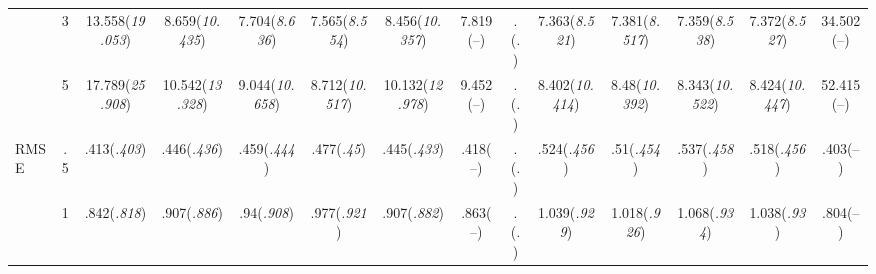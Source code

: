\documentclass{article}
\begin{document}
\begin{table}[tbp]
{\begin{tabularx}{\textwidth}{lCCCCCCCCCCCCC}
&3&13.558\newline (\emph{19.053})&8.659\newline (\emph{10.435})&7.704\newline (\emph{8.636})&7.565\newline (\emph{8.554})&8.456\newline (\emph{10.357})&7.819\newline (--)&.\newline (\emph{.})&7.363\newline (\emph{8.521})&7.381\newline (\emph{8.517})&7.359\newline (\emph{8.538})&7.372\newline (\emph{8.527})&34.502\newline (--) \tabularnewline
&5&17.789\newline (\emph{25.908})&10.542\newline (\emph{13.328})&9.044\newline (\emph{10.658})&8.712\newline (\emph{10.517})&10.132\newline (\emph{12.978})&9.452\newline (--)&.\newline (\emph{.})&8.402\newline (\emph{10.414})&8.48\newline (\emph{10.392})&8.343\newline (\emph{10.522})&8.424\newline (\emph{10.447})&52.415\newline (--) \tabularnewline
\midrule RMSE&.5&.413\newline (\emph{.403})&.446\newline (\emph{.436})&.459\newline (\emph{.444})&.477\newline (\emph{.45})&.445\newline (\emph{.433})&.418\newline (--)&.\newline (\emph{.})&.524\newline (\emph{.456})&.51\newline (\emph{.454})&.537\newline (\emph{.458})&.518\newline (\emph{.456})&.403\newline (--) \tabularnewline
&1&.842\newline (\emph{.818})&.907\newline (\emph{.886})&.94\newline (\emph{.908})&.977\newline (\emph{.921})&.907\newline (\emph{.882})&.863\newline (--)&.\newline (\emph{.})&1.039\newline (\emph{.929})&1.018\newline (\emph{.926})&1.068\newline (\emph{.934})&1.038\newline (\emph{.93})&.804\newline (--) \tabularnewline

\end{tabularx}}
\end{table}
\end{document}
